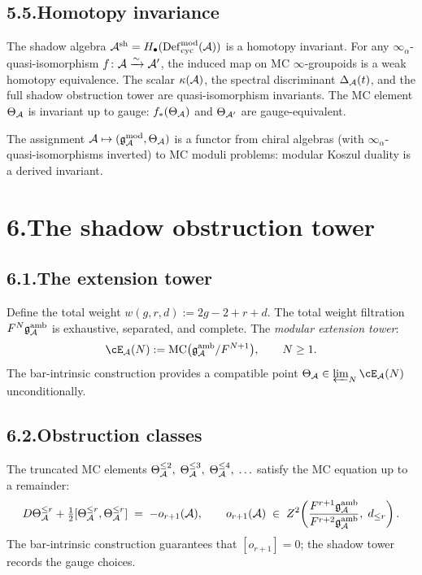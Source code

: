 \subsection*{5.5.\enspace Homotopy invariance}

The shadow algebra
$\mathcal{A}^{\mathrm{sh}}=H_\bullet(\mathrm{Def}_{\mathrm{cyc}}^{\mathrm{mod}}(\mathcal{A}))$ is a
homotopy invariant. For any $\infty_\alpha$-quasi-isomorphism
$f\colon\mathcal{A}\xrightarrow{\sim}\mathcal{A}'$, the induced map on MC
$\infty$-groupoids is a weak homotopy equivalence. The scalar
$\kappa(\mathcal{A})$, the spectral discriminant $\Delta_{\mathcal{A}}(t)$, and
the full shadow obstruction tower are quasi-isomorphism
invariants. The MC element $\Theta_{\mathcal{A}}$ is invariant up to
gauge: $f_*(\Theta_{\mathcal{A}})$ and $\Theta_{\mathcal{A}'}$ are
gauge-equivalent.

The assignment
$\mathcal{A}\mapsto(\mathfrak{g}_{\mathcal{A}}^{\mathrm{mod}},\Theta_{\mathcal{A}})$ is a functor from chiral
algebras (with $\infty_\alpha$-quasi-isomorphisms inverted) to MC
moduli problems: modular Koszul duality is a derived invariant.


\section*{6.\quad The shadow obstruction tower}

\subsection*{6.1.\enspace The extension tower}

Define the total weight $w(g,r,d):=2g-2+r+d$. The total weight
filtration $F^N\mathfrak{g}^{\mathrm{amb}}_{\mathcal{A}}$ is exhaustive,
separated, and complete. The \emph{modular extension tower}:
\[
\cE_\cA(N)
:=\operatorname{MC}\bigl(\mathfrak g^{\mathrm{amb}}_\cA/F^{N+1}\bigr),
\qquad N\ge 1.
\]
The bar-intrinsic construction provides a compatible point
$\Theta_\cA\in\varprojlim_{N}\cE_\cA(N)$ unconditionally.

\subsection*{6.2.\enspace Obstruction classes}

The truncated MC elements
$\Theta_{\mathcal{A}}^{\le 2},\;\Theta_{\mathcal{A}}^{\le 3},
\;\Theta_{\mathcal{A}}^{\le 4},\;\ldots$
satisfy the MC equation up to a remainder:
\[
D\Theta^{\le r}_{\mathcal{A}}
+\tfrac12[\Theta^{\le r}_{\mathcal{A}},\Theta^{\le r}_{\mathcal{A}}]
\;=\;
-o_{r+1}(\mathcal{A}),
\qquad
o_{r+1}(\mathcal{A})
\;\in\;
Z^2\!\left(\frac{F^{r+1}\mathfrak g^{\mathrm{amb}}_{\mathcal{A}}}
{F^{r+2}\mathfrak g^{\mathrm{amb}}_{\mathcal{A}}},\;d_{\le r}\right).
\]
The bar-intrinsic construction guarantees that
$[o_{r+1}]=0$; the shadow tower records the gauge choices.

